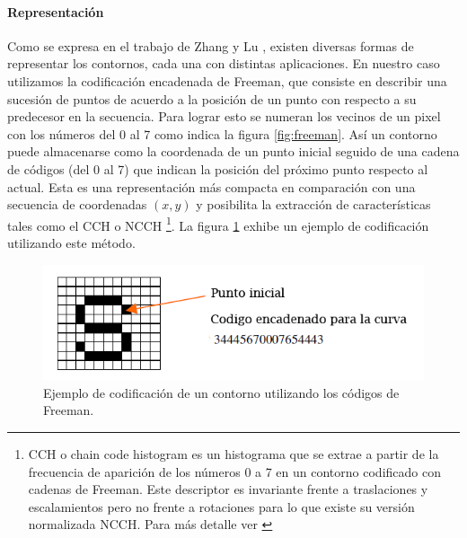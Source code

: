 	\paragraph{Representaci\'on}
	Como se expresa en el trabajo de Zhang y Lu \cite{Zhang02}, existen diversas formas de representar los contornos, cada una con
	distintas aplicaciones. En nuestro caso utilizamos la codificaci\'on 
	encadenada de Freeman, que consiste en describir una sucesi\'on de puntos
	de acuerdo a la posici\'on de un punto con respecto a su predecesor en 
	la secuencia. Para lograr esto se numeran los vecinos de un pixel con 
	los n\'umeros del 0 al 7 como indica la figura \ref{fig:freeman}. As\'i un contorno puede almacenarse como la coordenada de
	un punto inicial seguido de una cadena de c\'odigos (del 0 al 7) que indican la posici\'on del pr\'oximo punto respecto al actual. Esta 
	es una representaci\'on m\'as compacta en comparaci\'on con una secuencia 
	de coordenadas  $(x,y)$ y posibilita la extracci\'on de 
	caracter\'isticas tales como el CCH o NCCH \footnote{ CCH o chain 
	code histogram es un histograma que se extrae a partir de la 
	frecuencia de aparici\'on de los n\'umeros 0 a 7 en un contorno 
	codificado con cadenas de Freeman. Este descriptor es invariante 
	frente a traslaciones y escalamientos pero no frente a rotaciones 
	para lo que existe su versi\'on normalizada NCCH. Para m\'as detalle 
	ver \cite{Iivarinen96shaperecognition}}. La figura \ref{fig:freeman_sample} exhibe un 
	ejemplo de codificaci\'on utilizando este m\'etodo.
	
	\begin{figure}[htpb]
\begin{center}
  \includegraphics[scale=0.6]{vision/figures/freeman-sample.png}
\end{center}	
  \caption[Ejemplo de codificaci\'on de un contorno utilizando los c\'odigos de Freeman]
  {\small Ejemplo de codificaci\'on de un contorno utilizando los c\'odigos de Freeman. }
  \label{fig:freeman_sample}
\end{figure}

